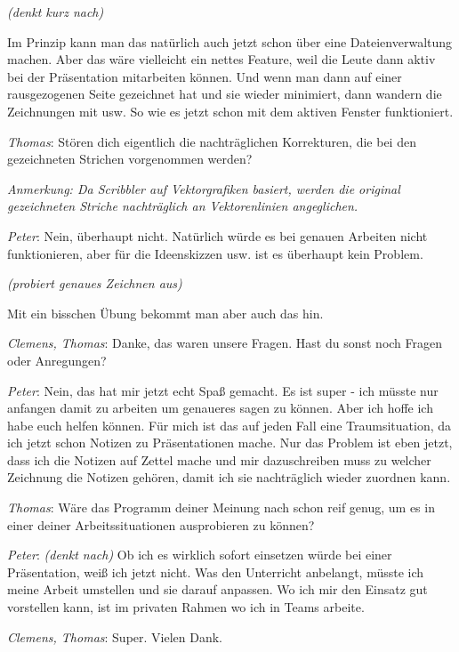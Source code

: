 \smallskip \emph{(denkt kurz nach)} 

\smallskip Im Prinzip kann man das natürlich auch jetzt schon über eine Dateienverwaltung machen. Aber das wäre vielleicht ein nettes Feature, weil die Leute dann aktiv bei der Präsentation mitarbeiten können. Und wenn man dann auf einer rausgezogenen Seite gezeichnet hat und sie wieder minimiert, dann wandern die Zeichnungen mit usw. So wie es jetzt schon mit dem aktiven Fenster funktioniert.

\medskip \emph{Thomas}: Stören dich eigentlich die nachträglichen Korrekturen, die bei den gezeichneten Strichen vorgenommen werden?

\smallskip \emph{Anmerkung: Da Scribbler auf Vektorgrafiken basiert, werden die original gezeichneten Striche nachträglich an Vektorenlinien angeglichen.}

\medskip \emph{Peter}: Nein, überhaupt nicht. Natürlich würde es bei genauen Arbeiten nicht funktionieren, aber für die Ideenskizzen usw. ist es überhaupt kein Problem. 

\smallskip \emph{(probiert genaues Zeichnen aus)}

\smallskip Mit ein bisschen Übung bekommt man aber auch das hin.

\medskip \emph{Clemens, Thomas}: Danke, das waren unsere Fragen. Hast du sonst noch Fragen oder Anregungen?

\medskip \emph{Peter}: Nein, das hat mir jetzt echt Spaß gemacht. Es ist super - ich müsste nur anfangen damit zu arbeiten um genaueres sagen zu können. Aber ich hoffe ich habe euch helfen können. Für mich ist das auf jeden Fall eine Traumsituation, da ich jetzt schon Notizen zu Präsentationen mache. Nur das Problem ist eben jetzt, dass ich die Notizen auf Zettel mache und mir dazuschreiben muss zu welcher Zeichnung die Notizen gehören, damit ich sie nachträglich wieder zuordnen kann.

\medskip \emph{Thomas}: Wäre das Programm deiner Meinung nach schon reif genug, um es in einer deiner Arbeitssituationen ausprobieren zu können?

\medskip \emph{Peter}: \emph{(denkt nach)}
Ob ich es wirklich sofort einsetzen würde bei einer Präsentation, weiß ich jetzt nicht. Was den Unterricht anbelangt, müsste ich meine Arbeit umstellen und sie darauf anpassen. Wo ich mir den Einsatz gut vorstellen kann, ist im privaten Rahmen wo ich in Teams arbeite.

\medskip \emph{Clemens, Thomas}: Super. Vielen Dank.

